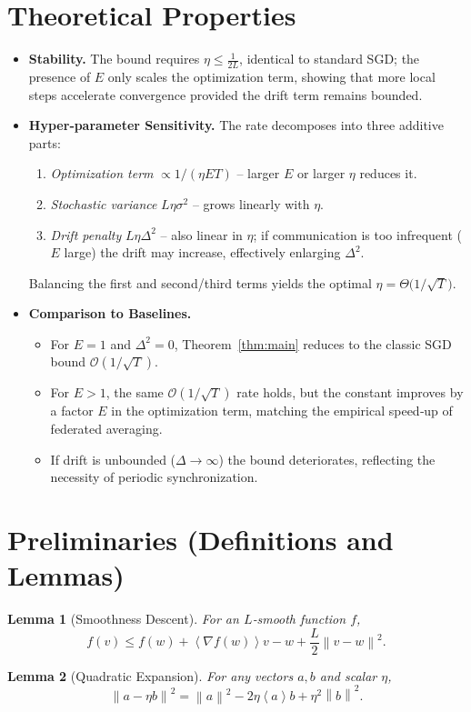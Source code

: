 \documentclass{article}
\newtheorem{lemma}{Lemma}
\newcommand{\norm}[1]{\left\lVert#1\right\rVert}
\newcommand{\inner}[1]{\left\langle#1\right\rangle}
\begin{document}
\section*{Theoretical Properties}
\begin{itemize}
    \item \textbf{Stability.} The bound requires $\eta\le \frac{1}{2L}$, identical to standard SGD; the presence of $E$ only scales the optimization term, showing that more local steps accelerate convergence provided the drift term remains bounded.
    \item \textbf{Hyper‑parameter Sensitivity.} The rate decomposes into three additive parts:
    \begin{enumerate}
        \item \emph{Optimization term} $\propto 1/(\eta E T)$ – larger $E$ or larger $\eta$ reduces it.
        \item \emph{Stochastic variance} $L\eta\sigma^{2}$ – grows linearly with $\eta$.
        \item \emph{Drift penalty} $L\eta\Delta^{2}$ – also linear in $\eta$; if communication is too infrequent ($E$ large) the drift may increase, effectively enlarging $\Delta^{2}$.
    \end{enumerate}
    Balancing the first and second/third terms yields the optimal $\eta = \Theta\!\bigl(1/\sqrt{T}\bigr)$.
    \item \textbf{Comparison to Baselines.}
    \begin{itemize}
        \item For $E=1$ and $\Delta^{2}=0$, Theorem~\ref{thm:main} reduces to the classic SGD bound $\mathcal{O}(1/\sqrt{T})$.
        \item For $E>1$, the same $\mathcal{O}(1/\sqrt{T})$ rate holds, but the constant improves by a factor $E$ in the optimization term, matching the empirical speed‑up of federated averaging.
        \item If drift is unbounded ($\Delta\to\infty$) the bound deteriorates, reflecting the necessity of periodic synchronization.
    \end{itemize}
\end{itemize}

\section*{Preliminaries (Definitions and Lemmas)}
\begin{lemma}[Smoothness Descent]\label{lem:smooth}
For an $L$‑smooth function $f$,
\[
    f(v) \le f(w) + \inner{\nabla f(w)}{v-w} + \frac{L}{2}\norm{v-w}^{2}.
\]
\end{lemma}
\begin{lemma}[Quadratic Expansion]\label{lem:expansion}
For any vectors $a,b$ and scalar $\eta$,
\[
    \norm{a-\eta b}^{2}= \norm{a}^{2} - 2\eta\inner{a}{b} + \eta^{2}\norm{b}^{2}.
\]
\end{lemma}
\end{document}

